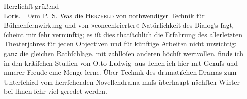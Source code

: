 \pstart
           Herzlichſt grüßend{\\[\baselineskip]}\spacefill\mbox{Loris.}\pend
           \leftskip=0em{}
\pstart
           \noindent{}\textsc{P. S.} Was die \textsc{Herzfeld} von nothwendiger Technik  für
                  Bühnenfernwirkung und von »concentrierter« Natürlichkeit des Dialog’s{ }ſagt,{ }ſcheint mir{ }ſehr vernünftig; {\pb}es iſt dies thatſächlich die Erfahrung des allerletzten Theaterjahres für jeden
                  Objectiven und für künftige Arbeiten nicht unwichtig: ganz die gleichen
                  Rathſchläge, mit zahlloſen anderen höchſt wertvollen, finde ich in den kritiſchen
                  Studien von Otto Ludwig, aus denen ich hier
                  mit Genuſs und innerer Freude eine Menge lerne. Über Technik des dramatiſchen
                  Dramas zum Unterſchied vom herrſchenden Novellendrama muſs überhaupt nächſten
                  Winter bei Ihnen{ }ſehr viel geredet werden.\pend
           \endnumbering{}  \newcommand{\dateiname}{L00111}\newcommand{\titel}{Hugo von Hofmannsthal an Arthur Schnitzler, 4. 8. [1892]}\newcommand{\editorInnen}{Martin Anton Müller und Gerd-Hermann Susen}
